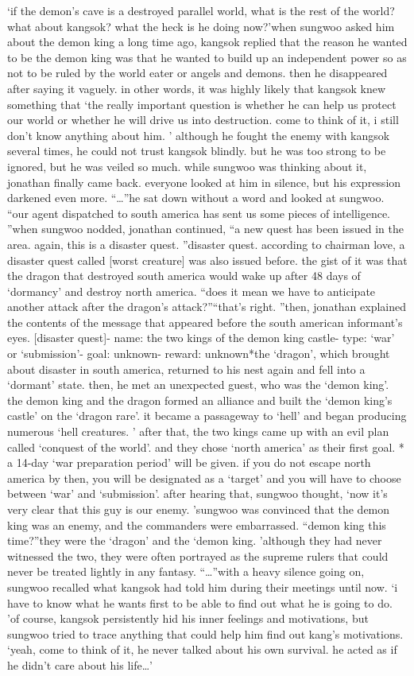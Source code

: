 ‘if the demon’s cave is a destroyed parallel world, what is the rest of the world? what about kangsok? what the heck is he doing now?’when sungwoo asked him about the demon king a long time ago, kangsok replied that the reason he wanted to be the demon king was that he wanted to build up an independent power so as not to be ruled by the world eater or angels and demons.
 then he disappeared after saying it vaguely.
 in other words, it was highly likely that kangsok knew something that ‘the really important question is whether he can help us protect our world or whether he will drive us into destruction.
 come to think of it, i still don’t know anything about him.
’
although he fought the enemy with kangsok several times, he could not trust kangsok blindly.
 but he was too strong to be ignored, but he was veiled so much.
while sungwoo was thinking about it, jonathan finally came back.
 everyone looked at him in silence, but his expression darkened even more.
“…”he sat down without a word and looked at sungwoo.
“our agent dispatched to south america has sent us some pieces of intelligence.
”when sungwoo nodded, jonathan continued, “a new quest has been issued in the area.
 again, this is a disaster quest.
”disaster quest.
according to chairman love, a disaster quest called [worst creature] was also issued before.
the gist of it was that the dragon that destroyed south america would wake up after 48 days of ‘dormancy’ and destroy north america.
“does it mean we have to anticipate another attack after the dragon’s attack?”“that’s right.
”then, jonathan explained the contents of the message that appeared before the south american informant’s eyes.
[disaster quest]- name: the two kings of the demon king castle- type: ‘war’ or ‘submission’- goal: unknown- reward: unknown*the ‘dragon’, which brought about disaster in south america, returned to his nest again and fell into a ‘dormant’ state.
 then, he met an unexpected guest, who was the ‘demon king’.
the demon king and the dragon formed an alliance and built the ‘demon king’s castle’ on the ‘dragon rare’.
 it became a passageway to ‘hell’ and began producing numerous ‘hell creatures.
’ after that, the two kings came up with an evil plan called ‘conquest of the world’.
 and they chose ‘north america’ as their first goal.
* a 14-day ‘war preparation period’ will be given.
 if you do not escape north america by then, you will be designated as a ‘target’ and you will have to choose between ‘war’ and ‘submission’.
after hearing that, sungwoo thought, ‘now it’s very clear that this guy is our enemy.
’sungwoo was convinced that the demon king was an enemy, and the commanders were embarrassed.
“demon king this time?”they were the ‘dragon’ and the ‘demon king.
’although they had never witnessed the two, they were often portrayed as the supreme rulers that could never be treated lightly in any fantasy.
“…”with a heavy silence going on, sungwoo recalled what kangsok had told him during their meetings until now.
‘i have to know what he wants first to be able to find out what he is going to do.
’of course, kangsok persistently hid his inner feelings and motivations, but sungwoo tried to trace anything that could help him find out kang’s motivations.
‘yeah, come to think of it, he never talked about his own survival.
 he acted as if he didn’t care about his life…’

